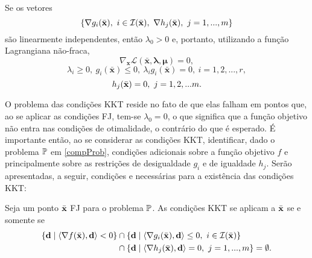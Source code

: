 \begin{corollary}
Se os vetores
\begin{equation*}
\left\lbrace\nabla g_i(\bar{\mathbf{x}}),~i \in \mathcal{I}(\bar{\mathbf{x}}),~\nabla h_j(\bar{\mathbf{x}}),~j = 1,...,m\right\rbrace
\end{equation*}
s\~{a}o linearmente independentes, ent\~{a}o $\lambda_0 > 0$ e, portanto, utilizando a fun\c{c}\~{a}o Lagrangiana n\~{a}o-fraca,
\begin{equation}
\label{KKTdef1}
\nabla_{\mathbf{x}} \mathcal{L}(\bar{\mathbf{x}},\mathbf{\lambda},\mathbf{\mu}) = 0,
\end{equation}
\begin{equation}
\lambda_i \ge 0,~ g_i(\bar{\mathbf{x}}) \le 0,~ \lambda_i g_i(\bar{\mathbf{x}}) = 0,~i = 1,2,...,r,
\end{equation}
\begin{equation}
h_j(\bar{\mathbf{x}}) = 0,~j=1,2,...m.
\end{equation}
\end{corollary}

O problema das condi\c{c}\~{o}es KKT reside no fato de que elas falham em pontos que, ao se aplicar as condi\c{c}\~{o}es FJ, tem-se $\lambda_0 = 0$, o que significa que a fun\c{c}\~{a}o objetivo n\~{a}o entra nas condi\c{c}\~{o}es de otimalidade, o contr\'{a}rio do que \'{e} esperado. \'{E} importante ent\~{a}o, ao se considerar as condi\c{c}\~{o}es KKT, identificar, dado o problema $\mathbb{P}$ em \eqref{compProb}, condi\c{c}\~{o}es adicionais sobre a fun\c{c}\~{a}o objetivo $f$ e principalmente sobre as restri\c{c}\~{o}es de desigualdade $g_i$ e de igualdade $h_j$. Ser\~{a}o apresentadas, a seguir, condi\c{c}\~{o}es e necess\'{a}rias para a exist\^{e}ncia das condi\c{c}\~{o}es KKT:

\begin{theorem}
Seja um ponto $\bar{\mathbf{x}}$ FJ para o problema $\mathbb{P}$. As condi\c{c}\~{o}es KKT se aplicam a $\bar{\mathbf{x}}$ se e somente se 
\begin{equation}
\begin{aligned}
\left\lbrace\mathbf{d}\mid\left\langle\nabla f(\bar{\mathbf{x}}),\mathbf{d}\right\rangle < 0\right\rbrace &\cap \left\lbrace\mathbf{d}\mid\left\langle\nabla g_i(\bar{\mathbf{x}}),\mathbf{d}\right\rangle \le 0,~i \in \mathcal{I}(\bar{\mathbf{x}})\right\rbrace \\ &\cap \left\lbrace\mathbf{d}\mid\left\langle\nabla h_j(\bar{\mathbf{x}}),\mathbf{d}\right\rangle = 0,~j = 1,...,m\right\rbrace = \emptyset.
\end{aligned}
\end{equation}
\end{theorem}

